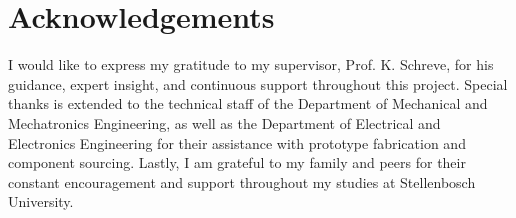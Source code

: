 \chapter*{Acknowledgements}

I would like to express my gratitude to my supervisor, Prof. K. Schreve, for his guidance, expert insight, and continuous support throughout this project. Special thanks is extended to the technical staff of the Department of Mechanical and Mechatronics Engineering, as well as the Department of Electrical and Electronics Engineering for their assistance with prototype fabrication and component sourcing. Lastly, I am grateful to my family and peers for their constant encouragement and support throughout my studies at Stellenbosch University. 

